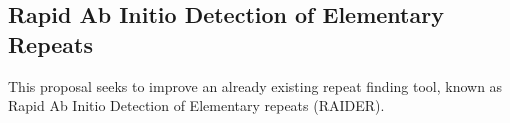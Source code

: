\subsection{Rapid Ab Initio Detection of Elementary Repeats}

This proposal seeks to improve an already existing repeat finding tool, known as Rapid Ab Initio Detection of Elementary repeats (RAIDER).
